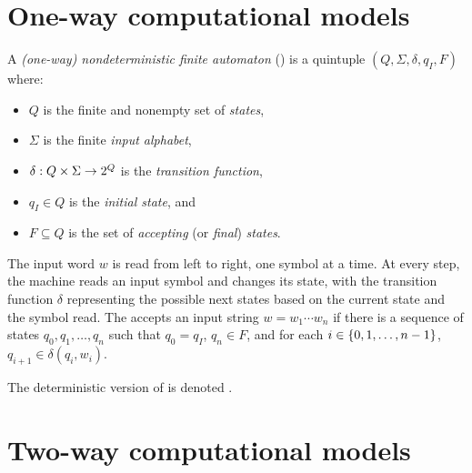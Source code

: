 \section{One-way computational models}
\begin{defn}
	A \emph{(one-way) nondeterministic finite automaton} (\ONFA) is a quintuple $(Q,\Sigma,\delta,q_I,F)$ where:
	\begin{itemize}
		\item $Q$ is the finite and nonempty set of \emph{states},
		\item $\Sigma$ is the finite \emph{input alphabet},
		\item $\delta:Q\times\Sigma\to2^{Q}$ is the \emph{transition function},
		\item $q_I\in Q$ is the \emph{initial state}, and
		\item $F\subseteq Q$ is the set of \emph{accepting} (or \emph{final}) \emph{states}.
	\end{itemize}
	The input word $w$ is read from left to right, one symbol at a time.
	At every step, the machine reads an input symbol and changes its state, with the transition function $\delta$ representing the possible next states based on the current state and the symbol read.
	The \ONFA accepts an input string $w=w_1\cdots w_n$ if there is a sequence of states $q_0,q_1,\dots,q_n$ such that $q_0=q_I$, $q_n\in F$, and for each $i\in\{0,1,\dots,n-1\}$, $q_{i+1}\in\delta(q_i,w_i)$.

	The deterministic version of \ONFA is denoted \ODFA.
\end{defn}



\section{Two-way computational models}

